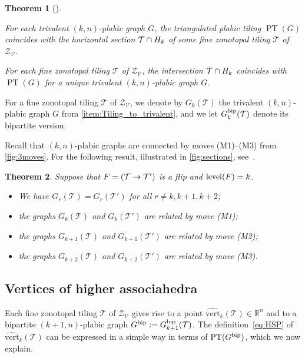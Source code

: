 \documentclass[11pt]{amsart}
\theoremstyle{plain}
\newtheorem{theorem}{Theorem}[section]
\theoremstyle{definition}
\def\R{\mathbb{R}}
\def\V{\mathcal{V}}
\def\Zon{\mathcal{Z}}
\def\ZV{\Zon_\V}
\def\level{\mathrm{level}}
\newcommand\wh[1]{\hstretch{2}{\hat{\hstretch{0.5}{#1}}}}
\def\vert{\mathrm{vert}}
\def\vertHSP{\wh\vert}
\def\vertHSP{\widehat{\vert}}
\def\PT{\operatorname{PT}}
\def\Tcal{\mathcal{T}}
\def\Tiling{\Tcal}
\begin{document}
\begin{theorem}[{\cite[Theorem 1.2]{Gal}}]\label{thm:Gal}
\ 
\begin{theoremlist}
\item For each trivalent $(k,n)$-plabic graph $G$, the triangulated plabic tiling $\PT(G)$ coincides with the horizontal section $\Tiling\cap \Hyp_k$ of some fine zonotopal tiling $\Tiling$ of $\ZV$.
\item\label{item:Tiling_to_trivalent} For each fine zonotopal tiling $\Tiling$ of $\ZV$,  the intersection $\Tiling\cap \Hyp_k$ coincides with $\PT(G)$ for a unique trivalent $(k,n)$-plabic graph $G$.
\end{theoremlist}
\end{theorem}
\noindent For a fine zonotopal tiling $\Tiling$ of $\ZV$, we denote by $G_k(\Tiling)$ the trivalent $(k,n)$-plabic graph $G$ from \cref{item:Tiling_to_trivalent}, and we let $\Gbip_k(\Tiling)$ denote its bipartite version.

Recall that $(k,n)$-plabic graphs are connected by moves (M1)--(M3) from \cref{fig:3moves}. For the following result, 
  illustrated in \cref{fig:sections},
see~\cite[Section~3]{Gal}.
\begin{theorem}\label{thm:flips_moves}
  Suppose that $\face=(\Tiling\to\Tiling')$ is a flip and $\level(\face)=k$.
\begin{itemize}
\item We have $G_r(\Tiling)=G_r(\Tiling')$ for all $r\neq k,k+1,k+2$;
\item the graphs $G_k(\Tiling)$ and $G_k(\Tiling')$ are related by move (M1);
\item the graphs $G_{k+1}(\Tiling)$ and $G_{k+1}(\Tiling')$ are related by move (M2);
\item the graphs $G_{k+2}(\Tiling)$ and $G_{k+2}(\Tiling')$ are related by move (M3).
\end{itemize}
\end{theorem}


\def\Area{\operatorname{Area}}
\def\flw#1{S^\cap(#1)}
\def\ar#1{\Area(\dualface{#1})}
\def\dualface#1{#1^\ast}

\subsection{Vertices of higher associahedra}
Each fine zonotopal tiling $\Tiling$ of $\ZV$ gives rise to a point $\vertHSP_k(\Tiling)\in\R^n$ and to a bipartite $(k+1,n)$-plabic graph $\Gbip:=\Gbip_{k+1}(\Tiling)$. The definition~\eqref{eq:HSP} of $\vertHSP_k(\Tiling)$ can be expressed in a simple way in terms of $\PT(\Gbip)$, which we now explain.
\end{document}
